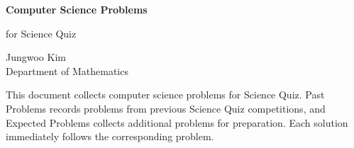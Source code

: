 \documentclass[11pt,oneside]{article}
\begin{document}
    \thispagestyle{empty}

    \begin{center}
        \vspace*{1.1cm}

        {\LARGE\bfseries Computer Science Problems\par}

        \vspace{0.25cm}

        {\large for Science Quiz\par}

        \vspace{0.75cm}

        {\normalsize
        Jungwoo Kim\\
        Department of Mathematics\\
        \PohangUniversityOfScienceAndTechnology
        \par}

    \end{center}

    \vspace{0.45cm}

    This document collects computer science problems for Science Quiz. Past Problems
    records problems from previous Science Quiz competitions, and Expected
    Problems collects additional problems for preparation. Each solution
    immediately follows the corresponding problem.

    \vspace{0.45cm}

    \tableofcontents

    
    
\end{document}
